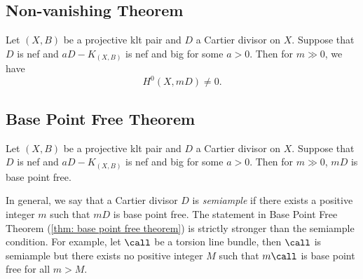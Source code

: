 
\subsection{Non-vanishing Theorem}

    \begin{theorem}\label{thm: non-vanishing theorem}
        Let \((X,B)\) be a projective klt pair and \(D\) a Cartier divisor on \(X\).
        Suppose that \(D\) is nef and \(aD-K_{(X,B)}\) is nef and big for some \(a > 0\).
        Then for \(m \gg 0\), we have 
        \[ H^0(X,mD) \neq 0. \]
    \end{theorem}

\subsection{Base Point Free Theorem}

    \begin{theorem}\label{thm: base point free theorem}
        Let \((X,B)\) be a projective klt pair and \(D\) a Cartier divisor on \(X\).
        Suppose that \(D\) is nef and \(aD-K_{(X,B)}\) is nef and big for some \(a > 0\).
        Then for \(m \gg 0\), \(mD\) is base point free.
    \end{theorem}

    \begin{remark}\label{rmk:statement_in_BPF_theorem_stronger_than_semiample}
        In general, we say that a Cartier divisor \(D\) is \emph{semiample} if there exists a positive integer \(m\) such that \(mD\) is base point free.
        The statement in Base Point Free Theorem (\cref{thm: base point free theorem}) is strictly stronger than the semiample condition.
        For example, let \(\call\) be a torsion line bundle, then \(\call\) is semiample but there exists no positive integer \(M\) such that \(m\call\) is base point free for all \(m>M\).
    \end{remark}

